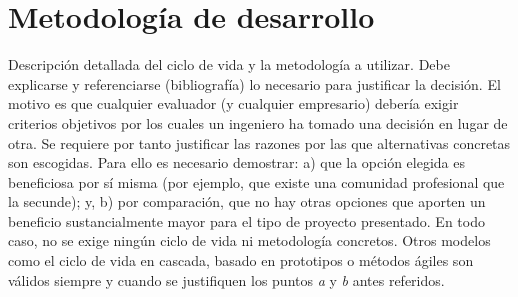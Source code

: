 \section{Metodología de desarrollo}
\label{sec:methodology}

\begin{shaded}
Descripción detallada del ciclo de vida y la metodología a utilizar. Debe explicarse y referenciarse (bibliografía) lo necesario para justificar la decisión. El motivo es que cualquier evaluador (y cualquier empresario) debería exigir criterios objetivos por los cuales un ingeniero ha tomado una decisión en lugar de otra. Se requiere por tanto justificar las razones por las que alternativas concretas son escogidas. Para ello es necesario demostrar: a) que la opción elegida es beneficiosa por sí misma (por ejemplo, que existe una comunidad profesional que la secunde); y, b) por comparación, que no hay otras opciones que aporten un beneficio sustancialmente mayor para el tipo de proyecto presentado. En todo caso, no se exige ningún ciclo de vida ni metodología concretos. Otros modelos como el ciclo de vida en cascada, basado en prototipos o métodos ágiles son válidos siempre y cuando se justifiquen los puntos \textit{a} y \textit{b} antes referidos.
\end{shaded}